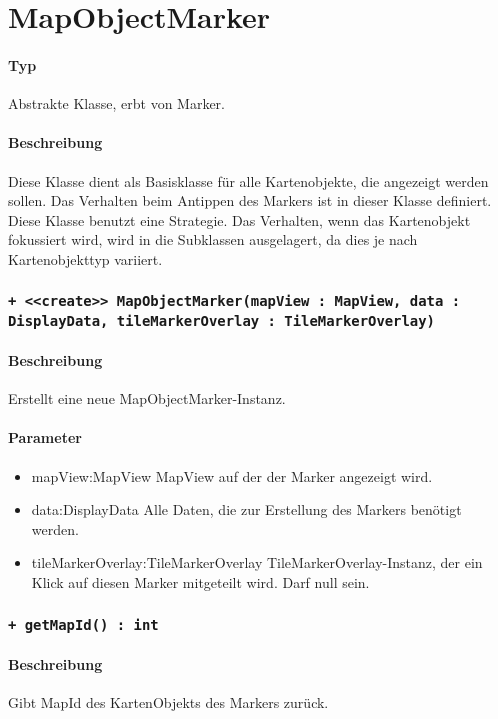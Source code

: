 \section{MapObjectMarker}
\paragraph*{Typ}
Abstrakte Klasse, erbt von Marker.
\paragraph*{Beschreibung}
Diese Klasse dient als Basisklasse für alle Kartenobjekte, die angezeigt werden sollen.
Das Verhalten beim Antippen des Markers ist in dieser Klasse definiert.
Diese Klasse benutzt eine Strategie. Das Verhalten, wenn das Kartenobjekt fokussiert wird,
wird in die Subklassen ausgelagert, da dies je nach Kartenobjekttyp variiert.

\subsubsection{\texttt{+ <<create>> MapObjectMarker(mapView : MapView, data : DisplayData, tileMarkerOverlay : TileMarkerOverlay)}}%
\paragraph*{Beschreibung}
Erstellt eine neue MapObjectMarker-Instanz.
\paragraph*{Parameter}
\begin{itemize}
    \item mapView:MapView MapView auf der der Marker angezeigt wird.
    \item data:DisplayData Alle Daten, die zur Erstellung des Markers benötigt werden.
    \item tileMarkerOverlay:TileMarkerOverlay TileMarkerOverlay-Instanz, der ein Klick 
    auf diesen Marker mitgeteilt wird. Darf null sein.
\end{itemize}

\subsubsection{\texttt{+ getMapId() : int}}%
\paragraph*{Beschreibung}
Gibt MapId des KartenObjekts des Markers zurück.
